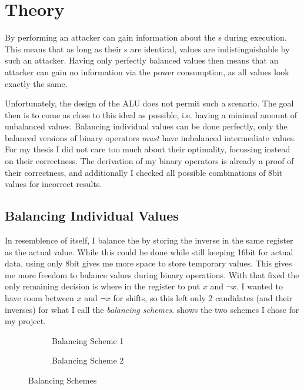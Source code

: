 \section{Theory}
\label{theory}
By performing \poweranalysis{} an attacker can gain information about the \hammingw{}s during execution.
This means that as long as their \hammingw{}s are identical, values are indistinguishable by such an attacker.
Having only perfectly balanced values then means that an attacker can gain no information via the power consumption, as all values look exactly the same.

Unfortunately, the design of the ALU does not permit such a scenario.
The goal then is to come as close to this ideal as possible, i.e. having a minimal amount of unbalanced values.
Balancing individual values can be done perfectly, only the balanced versions of binary operators \emph{must} have imbalanced intermediate values.
For my thesis I did not care too much about their optimality, focussing instead on their correctness.
The derivation of my binary operators is already a proof of their correctness, and additionally I checked all possible combinations of 8bit values for incorrect results.

\subsection{Balancing Individual Values}
In resemblence of \dual{} itself, I balance the \hammingw{} by storing the inverse in the same register as the actual value.
While this could be done while still keeping 16bit for actual data, using only 8bit gives me more space to store temporary values.
This gives me more freedom to balance values during binary operations.
With that fixed the only remaining decision is where in the register to put $x$ and $\neg{x}$.
I wanted to have room between $x$ and $\neg{x}$ for shifts, so this left only 2 candidates (and their inverses) for what I call the \emph{balancing schemes}.
 shows the two schemes I chose for my project.

\begin{figure}[h]
  \centering
  \begin{subfigure}{.49\linewidth}
    \centering
    \caption{Balancing Scheme 1}
    \label{fig:scheme1}
  \end{subfigure}
  \begin{subfigure}{0.49\linewidth}
    \centering
    \caption{Balancing Scheme 2}
  \end{subfigure}
  \caption{Balancing Schemes}
  \label{fig:schemes}
\end{figure}

